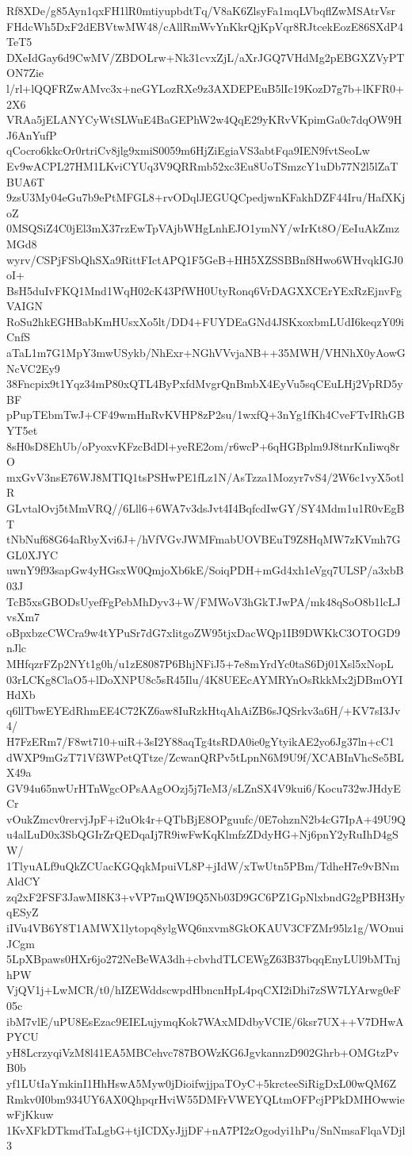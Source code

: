 Rf8XDe/g85Ayn1qxFH1lR0mtiyupbdtTq/V8aK6ZlsyFa1mqLVbqflZwMSAtrVsr
FHdcWh5DxF2dEBVtwMW48/cAllRmWvYnKkrQjKpVqr8RJtcekEozE86SXdP4TeT5
DXeIdGay6d9CwMV/ZBDOLrw+Nk31cvxZjL/aXrJGQ7VHdMg2pEBGXZVyPTON7Zie
l/rl+lQQFRZwAMvc3x+neGYLozRXe9z3AXDEPEuB5lIc19KozD7g7b+lKFR0+2X6
VRAa5jELANYCyWtSLWuE4BaGEPhW2w4QqE29yKRvVKpimGa0c7dqOW9HJ6AnYufP
qCocro6kkcOr0rtriCv8jlg9xmiS0059m6HjZiEgiaVS3abtFqa9IEN9fvtSeoLw
Ev9wACPL27HM1LKviCYUq3V9QRRmb52xc3Eu8UoTSmzcY1uDb77N2l5lZaTBUA6T
9zsU3My04eGu7b9ePtMFGL8+rvODqlJEGUQCpedjwnKFakhDZF44Iru/HafXKjoZ
0MSQSiZ4C0jEl3mX37rzEwTpVAjbWHgLnhEJO1ymNY/wIrKt8O/EeIuAkZmzMGd8
wyrv/CSPjFSbQhSXa9RittFIctAPQ1F5GeB+HH5XZSSBBnf8Hwo6WHvqkIGJ0oI+
BsH5duIvFKQ1Mnd1WqH02cK43PfWH0UtyRonq6VrDAGXXCErYExRzEjnvFgVAIGN
RoSu2hkEGHBabKmHUsxXo5lt/DD4+FUYDEaGNd4JSKxoxbmLUdI6keqzY09iCnfS
aTaL1m7G1MpY3mwUSykb/NhExr+NGhVVvjaNB++35MWH/VHNhX0yAowGNcVC2Ey9
38Fncpix9t1Yqz34mP80xQTL4ByPxfdMvgrQnBmbX4EyVu5sqCEuLHj2VpRD5yBF
pPupTEbmTwJ+CF49wmHnRvKVHP8zP2su/1wxfQ+3nYg1fKh4CveFTvIRhGBYT5et
8sH0sD8EhUb/oPyoxvKFzcBdDl+yeRE2om/r6wcP+6qHGBplm9J8tnrKnIiwq8rO
mxGvV3nsE76WJ8MTIQ1tsPSHwPE1fLz1N/AsTzza1Mozyr7vS4/2W6c1vyX5otlR
GLvtalOvj5tMmVRQ//6Lll6+6WA7v3dsJvt4I4BqfcdIwGY/SY4Mdm1u1R0vEgBT
tNbNuf68G64aRbyXvi6J+/hVfVGvJWMFmabUOVBEuT9Z8HqMW7zKVmh7GGL0XJYC
uwnY9f93sapGw4yHGsxW0QmjoXb6kE/SoiqPDH+mGd4xh1eVgq7ULSP/a3xbB03J
TcB5xsGBODsUyefFgPebMhDyv3+W/FMWoV3hGkTJwPA/mk48qSoO8b1lcLJvsXm7
oBpxbzcCWCra9w4tYPuSr7dG7xlitgoZW95tjxDacWQp1IB9DWKkC3OTOGD9nJlc
MHfqzrFZp2NYt1g0h/u1zE8087P6BhjNFiJ5+7e8mYrdYc0taS6Dj01Xsl5xNopL
03rLCKg8ClaO5+lDoXNPU8c5sR45Ilu/4K8UEEcAYMRYnOsRkkMx2jDBmOYIHdXb
q6llTbwEYEdRhmEE4C72KZ6aw8IuRzkHtqAhAiZB6sJQSrkv3a6H/+KV7sI3Jv4/
H7FzERm7/F8wt710+uiR+3sI2Y88aqTg4tsRDA0ie0gYtyikAE2yo6Jg37ln+cC1
dWXP9mGzT71Vf3WPetQTtze/ZcwanQRPv5tLpnN6M9U9f/XCABInVhcSe5BLX49a
GV94u65nwUrHTnWgcOPsAAgOOzj5j7IeM3/sLZnSX4V9kui6/Kocu732wJHdyECr
vOukZmcv0rervjJpF+i2uOk4r+QTbBjE8OPguufc/0E7ohznN2b4cG7IpA+49U9Q
u4alLuD0x3SbQGIrZrQEDqaIj7R9iwFwKqKlmfzZDdyHG+Nj6pnY2yRuIhD4gSW/
1TlyuALf9uQkZCUacKGQqkMpuiVL8P+jIdW/xTwUtn5PBm/TdheH7e9vBNmAldCY
zq2xF2FSF3JawMI8K3+vVP7mQWI9Q5Nb03D9GC6PZ1GpNlxbndG2gPBH3HyqESyZ
iIVu4VB6Y8T1AMWX1lytopq8ylgWQ6nxvm8GkOKAUV3CFZMr95lz1g/WOnuiJCgm
5LpXBpaws0HXr6jo272NeBeWA3dh+cbvhdTLCEWgZ63B37bqqEnyLUl9bMTnjhPW
VjQV1j+LwMCR/t0/hIZEWddscwpdHbncnHpL4pqCXI2iDhi7zSW7LYArwg0eF05c
ibM7vlE/uPU8EsEzac9EIELujymqKok7WAxMDdbyVCIE/6ksr7UX++V7DHwAPYCU
yH8LcrzyqiVzM8l41EA5MBCehvc787BOWzKG6JgvkannzD902Ghrb+OMGtzPvB0b
yf1LUtIaYmkinI1HhHswA5Myw0jDioifwjjpaTOyC+5krcteeSiRigDxL00wQM6Z
Rmkv0I0bm934UY6AX0QhpqrHviW55DMFrVWEYQLtmOFPcjPPkDMHOwwiewFjKkuw
1KvXFkDTkmdTaLgbG+tjICDXyJjjDF+nA7PI2zOgodyi1hPu/SnNmsaFlqaVDjl3
